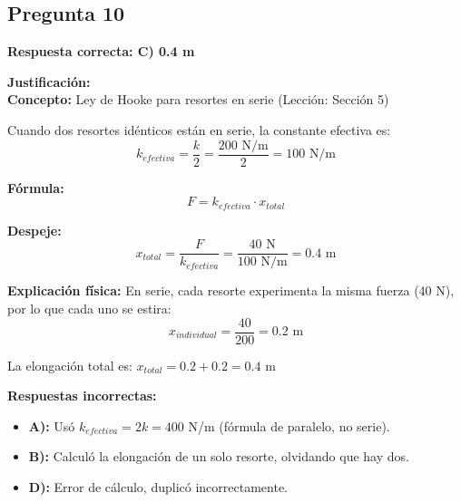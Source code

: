\begin{respuestabox}
\subsection{Pregunta 10}
\textcolor{verdecorrecto}{\textbf{Respuesta correcta: C) 0.4 m}}

\textbf{Justificación:}\\
\textbf{Concepto:} Ley de Hooke para resortes en serie (Lección: Sección 5)

Cuando dos resortes idénticos están en serie, la constante efectiva es:
$$k_{efectiva} = \frac{k}{2} = \frac{200 \text{ N/m}}{2} = 100 \text{ N/m}$$

\textbf{Fórmula:}
$$F = k_{efectiva} \cdot x_{total}$$

\textbf{Despeje:}
$$x_{total} = \frac{F}{k_{efectiva}} = \frac{40 \text{ N}}{100 \text{ N/m}} = 0.4 \text{ m}$$

\textbf{Explicación física:} En serie, cada resorte experimenta la misma fuerza (40 N), por lo que cada uno se estira:
$$x_{individual} = \frac{40}{200} = 0.2 \text{ m}$$

La elongación total es: $x_{total} = 0.2 + 0.2 = 0.4$ m

\textbf{Respuestas incorrectas:}
\begin{itemize}
    \item \textbf{A):} Usó $k_{efectiva} = 2k = 400$ N/m (fórmula de paralelo, no serie).
    \item \textbf{B):} Calculó la elongación de un solo resorte, olvidando que hay dos.
    \item \textbf{D):} Error de cálculo, duplicó incorrectamente.
\end{itemize}
\end{respuestabox}

